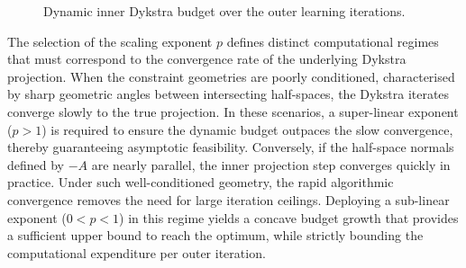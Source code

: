 \begin{figure}[htpb]
    \centering
    \caption{Dynamic inner Dykstra budget over the outer learning iterations.}
    \label{fig:dynamic_iteration_budget}
\end{figure}

The selection of the scaling exponent $p$ defines distinct computational regimes that must correspond to the convergence rate of the underlying Dykstra projection. When the constraint geometries are poorly conditioned, characterised by sharp geometric angles between intersecting half-spaces, the Dykstra iterates converge slowly to the true projection. In these scenarios, a super-linear exponent ($p > 1$) is required to ensure the dynamic budget outpaces the slow convergence, thereby guaranteeing asymptotic feasibility. Conversely, if the half-space normals defined by $-A$ are nearly parallel, the inner projection step converges quickly in practice. Under such well-conditioned geometry, the rapid algorithmic convergence removes the need for large iteration ceilings. Deploying a sub-linear exponent ($0 < p < 1$) in this regime yields a concave budget growth that provides a sufficient upper bound to reach the optimum, while strictly bounding the computational expenditure per outer iteration.

